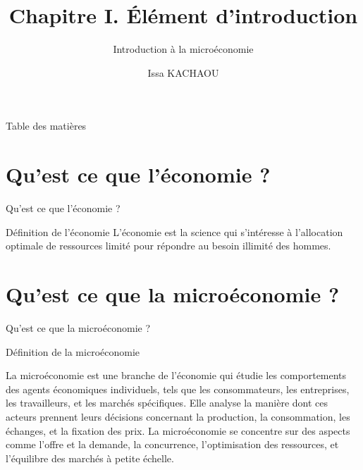\documentclass{beamer}
\title{Chapitre I. Élément d'introduction}
\subtitle{Introduction à la microéconomie}
\author{Issa KACHAOU}
\begin{document}
	\begin{frame}[plain]
		\maketitle
	\end{frame}


\begin{frame}{Table des matières}
\tableofcontents	
\end{frame}

\section{Qu'est ce que l'économie ?}
	\begin{frame}{Qu'est ce que l'économie ?}
		\begin{alertblock}{Définition de l'économie} 
		L'économie est la science qui s'intéresse à l'allocation optimale de ressources limité pour répondre au besoin illimité des hommes.
		\end{alertblock}

	\end{frame}
	
\section{Qu'est ce que la microéconomie ?}
	\begin{frame}{Qu'est ce que la microéconomie ?}

\begin{alertblock}{Définition de la microéconomie} 

La microéconomie est une branche de l'économie qui étudie les comportements des agents économiques individuels, tels que les consommateurs, les entreprises, les travailleurs, et les marchés spécifiques. Elle analyse la manière dont ces acteurs prennent leurs décisions concernant la production, la consommation, les échanges, et la fixation des prix. La microéconomie se concentre sur des aspects comme l'offre et la demande, la concurrence, l'optimisation des ressources, et l'équilibre des marchés à petite échelle.
\end{alertblock}

	\end{frame}
	
\end{document}
